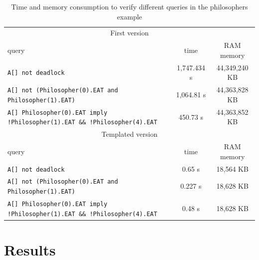 \documentclass[conference]{IEEEtran}
\begin{document}
\begin{table}[hb!]
\centering
\caption{Time and memory consumption to verify different queries in the philosophers example}
\begin{tabular}{l|c|c}
\multicolumn{3}{c}{First version}                                                                                   \\
query & time & RAM memory                                                                                       \\\hline
\verb+A[] not deadlock+                                                            &  1,747.434 s  & 44,349,240 KB  \\
\verb+A[] not (Philosopher(0).EAT and Philosopher(1).EAT)+                         &  1,064.81 s   & 44,363,828 KB  \\
\verb+A[] Philosopher(0).EAT imply !Philosopher(1).EAT && !Philosopher(4).EAT+     &  450.73 s     & 44,363,852 KB  \\
\multicolumn{3}{c}{Templated version}                                                                        \\
query & time & RAM memory                                                                                       \\\hline
\verb+A[] not deadlock+                                                           &  0.65 s        & 18,564 KB     \\
\verb+A[] not (Philosopher(0).EAT and Philosopher(1).EAT)+                        &  0.227 s       & 18,628 KB     \\
\verb+A[] Philosopher(0).EAT imply !Philosopher(1).EAT && !Philosopher(4).EAT+    &  0.48 s        & 18,628 KB     \\
\end{tabular}
\label{tab:results}
\end{table}


\section{Results}
\end{document}
